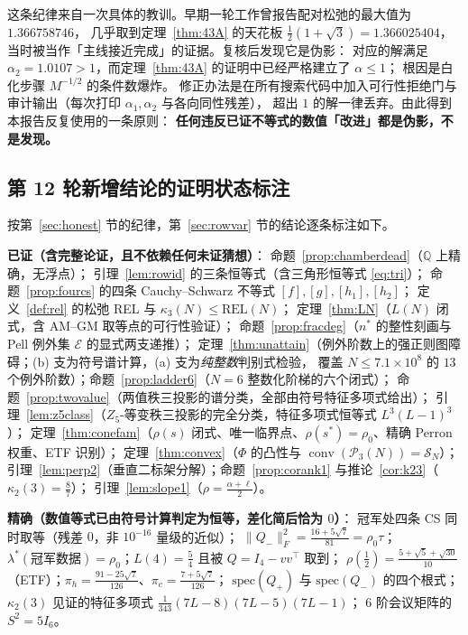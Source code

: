 \documentclass[UTF8,11pt]{ctexart}
\theoremstyle{definition}
\newcommand{\Q}{\mathbb{Q}}
\begin{document}
这条纪律来自一次具体的教训。早期一轮工作曾报告配对松弛的最大值为 $1.366758746$，
几乎取到定理~\ref{thm:43A} 的天花板 $\frac12(1+\sqrt3)=1.366025404$，
当时被当作「主线接近完成」的证据。复核后发现它是伪影：
对应的解满足 $\alpha_2=1.0107>1$，而定理~\ref{thm:43A} 的证明中已经严格建立了 $\alpha\le1$；
根因是白化步骤 $M^{-1/2}$ 的条件数爆炸。
修正办法是在所有搜索代码中加入可行性拒绝门与审计输出（每次打印 $\alpha_1,\alpha_2$ 与各向同性残差），
超出 $1$ 的解一律丢弃。由此得到本报告反复使用的一条原则：
\textbf{任何违反已证不等式的数值「改进」都是伪影，不是发现。}

\subsection{第 12 轮新增结论的证明状态标注}\label{sec:honest12}

按第~\ref{sec:honest} 节的纪律，第~\ref{sec:rowvar} 节的结论逐条标注如下。

\textbf{已证（含完整论证，且不依赖任何未证猜想）}：
命题~\ref{prop:chamberdead}（$\Q$ 上精确，无浮点）；
引理~\ref{lem:rowid} 的三条恒等式（含三角形恒等式 \eqref{eq:tri}）；
命题~\ref{prop:fourcs} 的四条 Cauchy--Schwarz 不等式 $[f],[g],[h_1],[h_2]$；
定义~\ref{def:rel} 的松弛 REL 与 $\kappa_3(N)\le\mathrm{REL}(N)$；
定理~\ref{thm:LN}（$L(N)$ 闭式，含 AM--GM 取等点的可行性验证）；
命题~\ref{prop:fracdeg}（$n^*$ 的整性刻画与 Pell 例外集 $\mathcal E$ 的显式两支递推）；
定理~\ref{thm:unattain}（例外阶数上的强正则图障碍；(b) 支为符号谱计算，(a) 支为\emph{纯整数}判别式检验，
覆盖 $N\le7.1\times10^8$ 的 $13$ 个例外阶数）；命题~\ref{prop:ladder6}（$N=6$ 整数化阶梯的六个闭式）；
命题~\ref{prop:twovalue}（两值秩三投影的谱分类，全部由符号特征多项式给出）；
引理~\ref{lem:z5class}（$Z_5$-等变秩三投影的完全分类，特征多项式恒等式 $L^3(L-1)^3$）；
定理~\ref{thm:conefam}（$\rho(s)$ 闭式、唯一临界点、$\rho(s^*)=\rho_0$、精确 Perron 权重、ETF 识别）；
定理~\ref{thm:convex}（$\Phi$ 的凸性与 $\operatorname{conv}(\mathcal P_3(N))=\mathcal S_N$）；
引理~\ref{lem:perp2}（垂直二标架分解）；命题~\ref{prop:corank1} 与推论~\ref{cor:k23}（$\kappa_2(3)=\frac87$）；
引理~\ref{lem:slope1}（$\rho=\frac{\alpha+\ell}2$）。

\textbf{精确（数值等式已由符号计算判定为恒等，差化简后恰为 $0$）}：
冠军处四条 CS 同时取等（残差 $0$，非 $10^{-16}$ 量级的近似）；
$\|Q_-\|_F^2=\frac{16+5\sqrt7}{81}=\rho_0\tau$；
$\lambda^*(\text{冠军数据})=\rho_0$；$L(4)=\frac54$ 且被 $Q=I_4-vv^\top$ 取到；
$\rho(\frac12)=\frac{5+\sqrt5+\sqrt{30}}{10}$（ETF）；$\pi_h=\frac{91-25\sqrt7}{126}$、$\pi_c=\frac{7+5\sqrt7}{126}$；
$\mathrm{spec}(Q_+)$ 与 $\mathrm{spec}(Q_-)$ 的四个根式；
$\kappa_2(3)$ 见证的特征多项式 $\frac1{343}(7L-8)(7L-5)(7L-1)$；
$6$ 阶会议矩阵的 $S^2=5I_6$。
\end{document}
